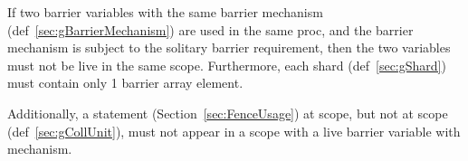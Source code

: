 
If two barrier variables with the same barrier mechanism (def~\ref{sec:gBarrierMechanism}) are used in the same proc, and the barrier mechanism is subject to the solitary barrier requirement, then the two variables must not be live in the same scope.
Furthermore, each shard (def~\ref{sec:gShard}) must contain only 1 barrier array element.

Additionally, a  statement (Section~\ref{sec:FenceUsage}) at  scope, but not at  scope (def~\ref{sec:gCollUnit}), must not appear in a scope with a live barrier variable with  mechanism.
